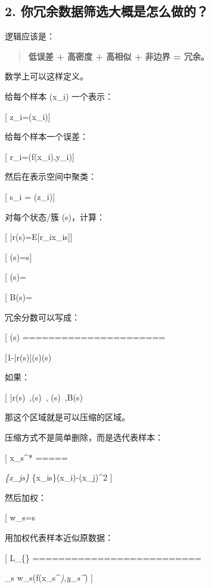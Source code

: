 \documentclass[
  12pt,
]{ctexart}
\begin{document}
\subsection{2.
你冗余数据筛选大概是怎么做的？}\label{ux4f60ux5197ux4f59ux6570ux636eux7b5bux9009ux5927ux6982ux662fux600eux4e48ux505aux7684}

逻辑应该是：

\begin{quote}
\textbf{低误差 + 高密度 + 高相似 + 非边界 = 冗余。}
\end{quote}

数学上可以这样定义。

给每个样本 (x\_i) 一个表示：

{[} z\_i=\phi(x\_i){]}

给每个样本一个误差：

{[} r\_i=\ell(f(x\_i),y\_i){]}

然后在表示空间中聚类：

{[} s\_i = (z\_i){]}

对每个状态/簇 (s)，计算：

{[} \bar r(s)=\mathbb E{[}r\_i\mid x\_i\in s{]}{]}

{[} \rho(s)=s{]}

{[} (s)=\text{within-state similarity}{]}

{[} B(s)=\text{boundary/novelty score}{]}

冗余分数可以写成：

{[} (s) ======================

{[}1-\bar r(s){]}\cdot \rho(s)\cdot {}(s)\cdot [1-B(s)]{]}

如果：

{[} \bar r(s)~,\quad \rho(s)~,\quad
{}(s)~,\quad B(s)~\text{低}{]}

那这个区域就是可以压缩的区域。

压缩方式不是简单删除，而是选代表样本：

{[} x\_s\^{}* =====

\arg\min\emph{\{x\_j\in s\}
\sum}\{x\_i\in s\}\textbar{}\phi(x\_i)-\phi(x\_j)\textbar\^{}2 {]}

然后加权：

{[} w\_s=\textbar s\textbar{]}

用加权代表样本近似原数据：

{[} \mathcal L\_\{\} ==========================

\sum\_s w\_s\ell(f(x\_s\^{}\emph{),y\_s\^{}}) {]}
\end{document}
